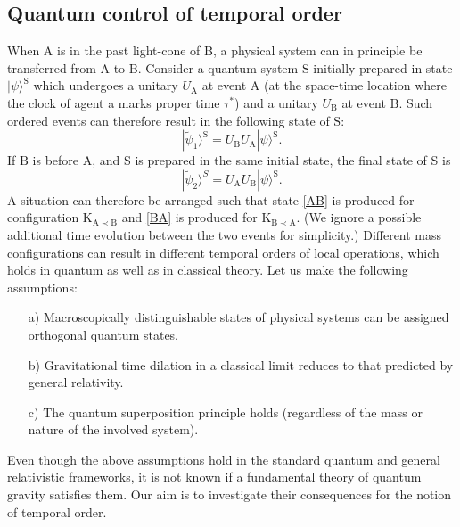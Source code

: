\documentclass[a4paper,11pt]{article}
\newcommand{\ket}{\rangle}
\begin{document}
\subsection*{Quantum control of temporal order}
\label{qcontrol}
When $\mathrm A$ is in the past light-cone of $\mathrm B$, a physical system can in principle be transferred from $\mathrm A$ to $\mathrm B$. Consider a quantum system $\mathrm S$ initially prepared in state $|\psi\ket^\mathrm{S}$ which undergoes a unitary $U_\mathrm{A}$ at event $\mathrm A$ ({at the space-time location where the clock of agent a marks proper time $\tau^*$}) and a unitary $U_\mathrm{B}$ at event $\mathrm B$. Such ordered events can therefore result in the following state of $\mathrm S$:
%
\begin{equation}
|\widetilde{\psi}_1\ket^\mathrm{S} = U_\mathrm{B}U_\mathrm{A} |\psi\ket^\mathrm{S}.
\label{AB}
\end{equation}
%
If $\mathrm B$ is before $\mathrm A$, and $\mathrm S$ is prepared in the same initial state, the final state of $\mathrm S$ is
%
\begin{equation}
|\widetilde{\psi}_2\ket^S = U_\mathrm{A} U_\mathrm{B} |\psi\ket^\mathrm{S}.
\label{BA}
\end{equation}
A situation can therefore be arranged such that state \eqref{AB} is produced for configuration $\mathrm{K_{A\prec B}}$ and \eqref{BA} is produced for $\mathrm{K_{B\prec A}}$. (We ignore a possible additional time evolution between the two events for simplicity.) Different mass configurations can result in different temporal orders of local operations, which holds in quantum as well as in classical theory. 
Let us make the following assumptions:
\begin{enumerate}
\item[a)] Macroscopically distinguishable states of physical systems can be assigned orthogonal quantum states.
\item[b)] Gravitational time dilation in a %
classical limit reduces to that predicted by general relativity.
\item[c)]\label{superpos} The quantum superposition principle holds (regardless of the mass or nature of the involved system).
\end{enumerate}
Even though the above assumptions hold in the standard quantum and general relativistic frameworks,  it is not known if a fundamental theory of quantum gravity satisfies them. Our aim is to investigate their consequences for the notion of temporal order.
\end{document}

